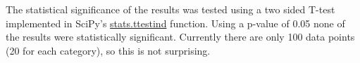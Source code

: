 The statistical significance of the results was tested using a two sided T-test implemented
in {SciPy}'s\cite{2020SciPy-NMeth} \href{https://docs.scipy.org/doc/scipy/reference/generated/scipy.stats.ttest_ind.html}{stats.ttest{\textunderscore}ind} function.
Using a p-value of 0.05 none of the results were statistically significant. 
Currently there are only 100 data points (20 for each category), so this is not 
surprising. 


